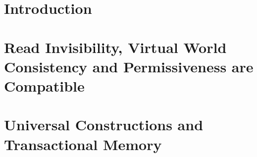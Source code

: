 \documentclass[11pt]{book}
\begin{document}
\chapter{Introduction}
%
%


\chapter{Read Invisibility, Virtual World Consistency and Permissiveness are Compatible}
\label{chap:VWC}



\chapter{Universal Constructions and Transactional Memory}
\label{chap:UC}
%

\end{document}
